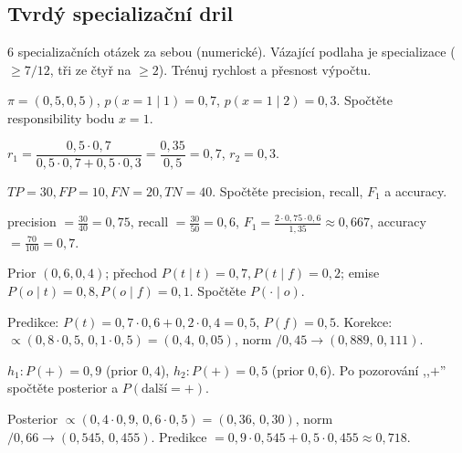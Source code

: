 \subsection*{Tvrdý specializační dril}
\begin{infobox}[title={Pokyny}]
\footnotesize 6 specializačních otázek za sebou (numerické). Vázající podlaha je specializace ($\ge7/12$, tři ze čtyř na $\ge2$). Trénuj rychlost a přesnost výpočtu.
\end{infobox}

\begin{zadani}$\pi=(0{,}5,0{,}5)$, $p(x{=}1\mid1)=0{,}7$, $p(x{=}1\mid2)=0{,}3$. Spočtěte responsibility bodu $x{=}1$.\end{zadani}
\begin{reseni}$r_1=\dfrac{0{,}5\cdot0{,}7}{0{,}5\cdot0{,}7+0{,}5\cdot0{,}3}=\dfrac{0{,}35}{0{,}5}=0{,}7$, $r_2=0{,}3$.\end{reseni}

\begin{zadani}$TP{=}30,FP{=}10,FN{=}20,TN{=}40$. Spočtěte precision, recall, $F_1$ a accuracy.\end{zadani}
\begin{reseni}precision $=\tfrac{30}{40}=0{,}75$, recall $=\tfrac{30}{50}=0{,}6$, $F_1=\tfrac{2\cdot0{,}75\cdot0{,}6}{1{,}35}\approx0{,}667$, accuracy $=\tfrac{70}{100}=0{,}7$.\end{reseni}

\begin{zadani}Prior $(0{,}6,0{,}4)$; přechod $P(t\mid t)=0{,}7,P(t\mid f)=0{,}2$; emise $P(o\mid t)=0{,}8,P(o\mid f)=0{,}1$. Spočtěte $P(\cdot\mid o)$.\end{zadani}
\begin{reseni}Predikce: $P(t)=0{,}7\cdot0{,}6+0{,}2\cdot0{,}4=0{,}5$, $P(f)=0{,}5$. Korekce: $\propto(0{,}8\cdot0{,}5,\,0{,}1\cdot0{,}5)=(0{,}4,\,0{,}05)$, norm $/0{,}45\to(0{,}889,\,0{,}111)$.\end{reseni}

\begin{zadani}$h_1{:}P(+)=0{,}9$ (prior $0{,}4$), $h_2{:}P(+)=0{,}5$ (prior $0{,}6$). Po pozorování ,,$+$'' spočtěte posterior a $P(\text{další}{=}+)$.\end{zadani}
\begin{reseni}Posterior $\propto(0{,}4\cdot0{,}9,\,0{,}6\cdot0{,}5)=(0{,}36,\,0{,}30)$, norm $/0{,}66\to(0{,}545,\,0{,}455)$. Predikce $=0{,}9\cdot0{,}545+0{,}5\cdot0{,}455\approx0{,}718$.\end{reseni}

